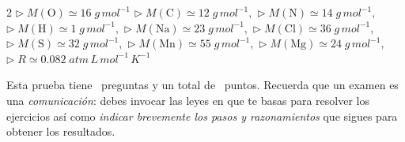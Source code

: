 \documentclass[a4paper,addpoints,14pt]{exam}
\newcommand*\chem[1]{\ensuremath{\mathrm{#1}}}
\begin{document}


\begin{learn}
\begin{multicols}{2}
{$\triangleright\; M(\chem{O})\simeq16\;g\,mol^{-1}$\newline
$\triangleright\; M(\chem{C})\simeq12\;g\,mol^{-1},$\newline
$\triangleright\; M(\chem{N})\simeq14\;g\,mol^{-1},$\newline
$\triangleright\; M(\chem{H})\simeq1\;g\,mol^{-1},$\newline
$\triangleright\; M(\chem{Na})\simeq 23\;g\,mol^{-1},$\newline
$\triangleright\; M(\chem{Cl})\simeq 36\;g\,mol^{-1},$\newline
$\triangleright\; M(\chem{S})\simeq32\;g\,mol^{-1},$\newline
$\triangleright\; M(\chem{Mn})\simeq55\;g\,mol^{-1},$\newline
$\triangleright\; M(\chem{Mg})\simeq 24\;g\,mol^{-1},$\newline
$\triangleright\; R\simeq 0.082\;atm\,L\,mol^{-1}\,K^{-1}$
}
\end{multicols}
\end{learn}	

\vspace{2ex}

\begin{problemas}{Esta prueba tiene \numquestions\ preguntas y un total de 
\numpoints\  puntos. Recuerda que un examen es una \textit{comunicación}: debes invocar las leyes en que te basas para resolver los ejercicios así como \textit{indicar brevemente los pasos y razonamientos} que sigues para obtener los resultados.}
\end{problemas}
\vspace{9ex}

\boxedpoints
\end{document}
